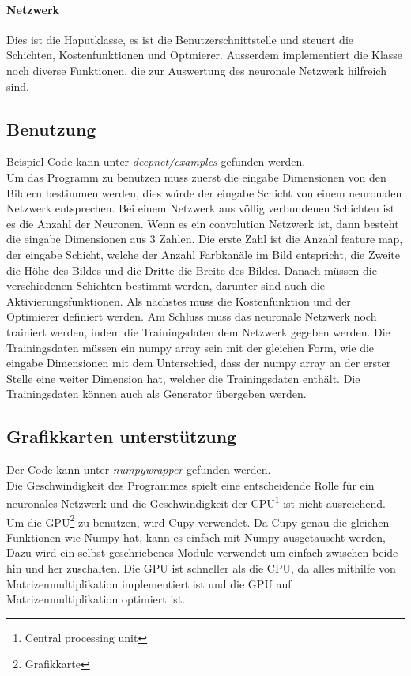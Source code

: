 \documentclass[12pt,a4paper]{report}
\begin{document}
\paragraph{Netzwerk}
Dies ist die Haputklasse, es ist die Benutzerschnittstelle und
steuert die Schichten, Kostenfunktionen und Optmierer.
Ausserdem implementiert die Klasse noch diverse Funktionen, die zur Auswertung des neuronale Netzwerk hilfreich sind.

\subsection{Benutzung}
Beispiel Code kann unter \textit{deepnet/examples} gefunden werden.\bigskip\\
Um das Programm zu benutzen muss zuerst die eingabe Dimensionen von den Bildern bestimmen werden,
dies würde der eingabe Schicht von einem neuronalen Netzwerk entsprechen.
Bei einem Netzwerk aus völlig verbundenen Schichten ist es die Anzahl der Neuronen.
Wenn es ein convolution Netzwerk ist, dann besteht die eingabe Dimensionen aus 3 Zahlen.
Die erste Zahl ist die Anzahl feature map, der eingabe Schicht, welche der Anzahl Farbkanäle im Bild entspricht,
die Zweite die Höhe des Bildes und die Dritte die Breite des Bildes.
Danach müssen die verschiedenen Schichten bestimmt werden, darunter sind auch die Aktivierungsfunktionen.
Als nächstes muss die Kostenfunktion und der Optimierer definiert werden.
Am Schluss muss das neuronale Netzwerk noch trainiert werden, indem die Trainingsdaten dem Netzwerk gegeben werden.
Die Trainingsdaten müssen ein numpy array sein mit der gleichen Form, wie die eingabe Dimensionen mit dem Unterschied,
dass der numpy array an der erster Stelle eine weiter Dimension hat, welcher die Trainingsdaten enthält.
Die Trainingsdaten können auch als Generator übergeben werden.

\subsection{Grafikkarten unterstützung}
Der Code kann unter \textit{numpywrapper} gefunden werden.\bigskip\\
Die Geschwindigkeit des Programmes spielt eine entscheidende Rolle für ein
neuronales Netzwerk und die Geschwindigkeit der CPU\footnote{Central processing unit} ist nicht ausreichend.
Um die GPU\footnote{Grafikkarte} zu benutzen, wird Cupy verwendet.
Da Cupy genau die gleichen Funktionen wie Numpy hat, kann es einfach mit Numpy ausgetauscht werden,
Dazu wird ein selbst geschriebenes Module verwendet um einfach zwischen beide hin und her zuschalten.
Die GPU ist schneller als die CPU, da alles mithilfe von Matrizenmultiplikation implementiert ist und
die GPU auf Matrizenmultiplikation optimiert ist.
\end{document}
